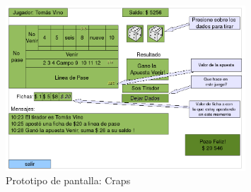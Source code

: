 	

	\begin{figure}[p!hbt]
		\centering
		\includegraphics[width=0.8\textwidth]{../img/PP_Craps.png}
		\caption{Prototipo de pantalla: Craps }
		\label{fig:craps}
	\end{figure}

